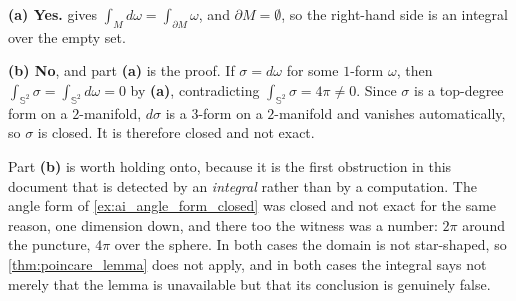 \begin{answer}
\textbf{(a) Yes.}  gives
$\int_M d\omega = \int_{\partial M}\omega$, and $\partial M = \emptyset$, so the right-hand side
is an integral over the empty set.

\textbf{(b) No}, and part \textbf{(a)} is the proof. If $\sigma = d\omega$ for some $1$-form
$\omega$, then $\int_{\mathbb{S}^2}\sigma = \int_{\mathbb{S}^2}d\omega = 0$ by \textbf{(a)},
contradicting $\int_{\mathbb{S}^2}\sigma = 4\pi \neq 0$. Since $\sigma$ is a top-degree form on a
$2$-manifold, $d\sigma$ is a $3$-form on a $2$-manifold and vanishes automatically, so $\sigma$ is
closed. It is therefore closed and not exact.
\end{answer}

\begin{ainote}
Part \textbf{(b)} is worth holding onto, because it is the first obstruction in this document
that is detected by an \emph{integral} rather than by a computation. The angle form of
\cref{ex:ai_angle_form_closed} was closed and not exact for the same reason, one dimension down,
and there too the witness was a number: $2\pi$ around the puncture, $4\pi$ over the sphere. In
both cases the domain is not star-shaped, so \cref{thm:poincare_lemma} does not apply, and in
both cases the integral says not merely that the lemma is unavailable but that its conclusion is
genuinely false.
\end{ainote}
